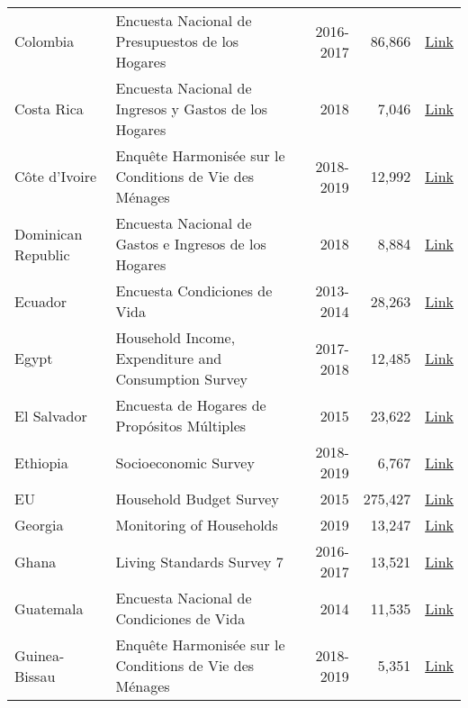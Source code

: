 \begin{ThreePartTable}
\begin{longtable}[t]{l|p{8cm}|r|r|c}
        Colombia & Encuesta Nacional de Presupuestos de los Hogares & 2016-2017 &  86,866  & \href{https://www.dane.gov.co/index.php/estadisticas-por-tema/pobreza-y-condiciones-de-vida/encuesta-nacional-de-presupuestos-de-los-hogares-enph}{Link} \\ 
        Costa Rica & Encuesta Nacional de Ingresos y Gastos de los Hogares & 2018 &  7,046  & \href{https://inec.cr/estadisticas-fuentes/encuestas/encuesta-nacional-ingresos-gastos-los-hogares}{Link} \\ 
        Côte d'Ivoire & Enquête Harmonisée sur le Conditions de Vie des Ménages & 2018-2019 &  12,992  & \href{https://microdata.worldbank.org/index.php/catalog/4292/study-description}{Link} \\ 
        Dominican Republic & Encuesta Nacional de Gastos e Ingresos de los Hogares & 2018 &  8,884  & \href{https://archivo.one.gob.do/encuestas/enigh}{Link} \\ 
        Ecuador & Encuesta Condiciones de Vida & 2013-2014 &  28,263  & \href{https://aplicaciones3.ecuadorencifras.gob.ec/BIINEC-war/index.xhtml}{Link} \\ 
        Egypt & Household Income, Expenditure and Consumption Survey & 2017-2018 &  12,485  & \href{http://www.erfdataportal.com/index.php/catalog/129}{Link} \\ 
        El Salvador & Encuesta de Hogares de Propósitos Múltiples & 2015 &  23,622  & \href{http://www.digestyc.gob.sv/index.php/temas/des/ehpm.html}{Link} \\ 
        Ethiopia & Socioeconomic Survey & 2018-2019 &  6,767  & \href{https://microdata.worldbank.org/index.php/catalog/3823}{Link} \\ 
        EU & Household Budget Survey & 2015 &  275,427  & \href{https://ec.europa.eu/eurostat/web/microdata/household-budget-survey}{Link} \\ 
        Georgia & Monitoring of Households & 2019 &  13,247  & \href{https://www.geostat.ge/en/modules/categories/128/databases-of-2009-2016-integrated-household-survey-and-2017-households-income-and-expenditure-survey}{Link} \\ 
        Ghana & Living Standards Survey 7 & 2016-2017 &  13,521  & \href{https://www2.statsghana.gov.gh/nada/index.php/catalog/97/study-description}{Link} \\ 
        Guatemala & Encuesta Nacional de Condiciones de Vida & 2014 &  11,535  & \href{https://www.proyectoencovi.com/}{Link} \\ 
        Guinea-Bissau & Enquête Harmonisée sur le Conditions de Vie des Ménages & 2018-2019 &  5,351  & \href{https://microdata.worldbank.org/index.php/catalog/4293}{Link} \\ 

\end{longtable}
\end{ThreePartTable}
